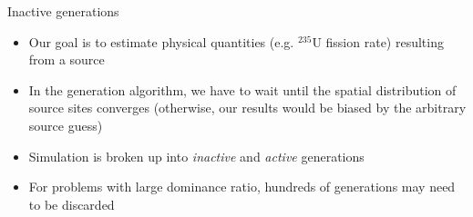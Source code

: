 \documentclass[noamssymb,svgnames]{beamer}
\begin{document}
\begin{frame}{Inactive generations}
  \begin{itemize}
  \item Our goal is to estimate physical quantities (e.g. $^{235}$U fission
    rate) resulting from a source
  \item In the generation algorithm, we have to wait until the spatial
    distribution of source sites converges (otherwise, our results would be
    biased by the arbitrary source guess)
  \item Simulation is broken up into \emph{inactive} and \emph{active}
    generations
  \item For problems with large dominance ratio, hundreds of generations may
    need to be discarded
  \end{itemize}
\end{frame}
\end{document}
